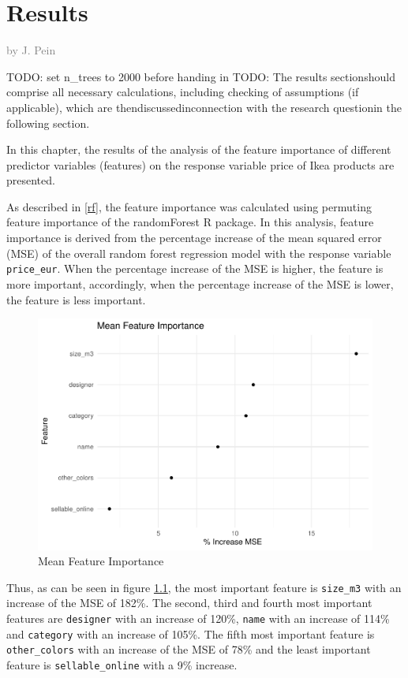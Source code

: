 \documentclass[a4paper, nobind]{templates/ociamthesis}
\begin{document}
\hypertarget{results}{%
\chapter{Results}\label{results}}

\hfill\textcolor{gray}{by J. Pein}

TODO: set n\_trees to 2000 before handing in
TODO: The results sectionshould comprise all necessary calculations, including checking of assumptions (if applicable), which are thendiscussedinconnection with the research questionin the following section.

In this chapter, the results of the analysis of the feature importance of different predictor variables (features) on the response variable price of Ikea products are presented.

As described in \ref{rf}, the feature importance was calculated using permuting feature importance of the randomForest R package. In this analysis, feature importance is derived from the percentage increase of the mean squared error (MSE) of the overall random forest regression model with the response variable \texttt{price\_eur}. When the percentage increase of the MSE is higher, the feature is more important, accordingly, when the percentage increase of the MSE is lower, the feature is less important.

\begin{figure}[!h]
\includegraphics[width=1\linewidth]{_main_files/figure-latex/mean-feature-importance-1} \caption{Mean Feature Importance}\label{fig:mean-feature-importance}
\end{figure}

Thus, as can be seen in figure \ref{fig:mean-feature-importance}, the most important feature is \texttt{size\_m3} with an increase of the MSE of 182\%. The second, third and fourth most important features are \texttt{designer} with an increase of 120\%, \texttt{name} with an increase of 114\% and \texttt{category} with an increase of 105\%. The fifth most important feature is \texttt{other\_colors} with an increase of the MSE of 78\% and the least important feature is \texttt{sellable\_online} with a 9\% increase.
\end{document}
